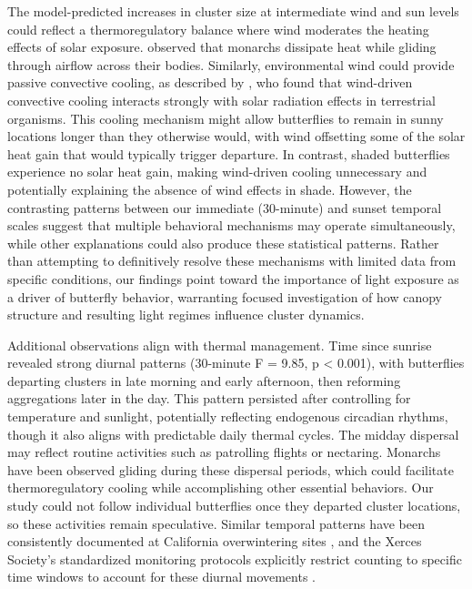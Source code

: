 The model-predicted increases in cluster size at intermediate wind and sun levels could reflect a thermoregulatory balance where wind moderates the heating effects of solar exposure. \textcite{mastersMonarchButterflyDanaus1988} observed that monarchs dissipate heat while gliding through airflow across their bodies. Similarly, environmental wind could provide passive convective cooling, as described by \textcite{riddellWindNicheThermal2025}, who found that wind-driven convective cooling interacts strongly with solar radiation effects in terrestrial organisms. This cooling mechanism might allow butterflies to remain in sunny locations longer than they otherwise would, with wind offsetting some of the solar heat gain that would typically trigger departure. In contrast, shaded butterflies experience no solar heat gain, making wind-driven cooling unnecessary and potentially explaining the absence of wind effects in shade. However, the contrasting patterns between our immediate (30-minute) and sunset temporal scales suggest that multiple behavioral mechanisms may operate simultaneously, while other explanations could also produce these statistical patterns. Rather than attempting to definitively resolve these mechanisms with limited data from specific conditions, our findings point toward the importance of light exposure as a driver of butterfly behavior, warranting focused investigation of how canopy structure and resulting light regimes influence cluster dynamics.

Additional observations align with thermal management. Time since sunrise revealed strong diurnal patterns (30-minute F = 9.85, p < 0.001), with butterflies departing clusters in late morning and early afternoon, then reforming aggregations later in the day. This pattern persisted after controlling for temperature and sunlight, potentially reflecting endogenous circadian rhythms, though it also aligns with predictable daily thermal cycles. The midday dispersal may reflect routine activities such as patrolling flights or nectaring. Monarchs have been observed gliding during these dispersal periods, which could facilitate thermoregulatory cooling while accomplishing other essential behaviors. Our study could not follow individual butterflies once they departed cluster locations, so these activities remain speculative. Similar temporal patterns have been consistently documented at California overwintering sites \parencite{tuskesOverwinteringEcologyMonarch1978,chaplinEnergyReservesMetabolic1982}, and the Xerces Society's standardized monitoring protocols explicitly restrict counting to specific time windows to account for these diurnal movements \parencite{xercessocietyStepbyStepWesternMonarch2017}.

